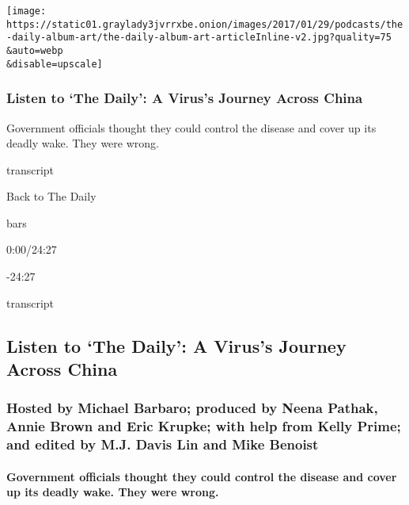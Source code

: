 \texttt{[image: https://static01.graylady3jvrrxbe.onion/images/2017/01/29/podcasts/the-daily-album-art/the-daily-album-art-articleInline-v2.jpg?quality=75\\\&auto=webp\\\&disable=upscale]}

\hypertarget{listen-to-the-daily-a-viruss-journey-across-china}{%
\subsubsection{Listen to `The Daily': A Virus's Journey Across
China}\label{listen-to-the-daily-a-viruss-journey-across-china}}

Government officials thought they could control the disease and cover up
its deadly wake. They were wrong.

transcript

Back to The Daily

bars

0:00/24:27

-24:27

transcript

\hypertarget{listen-to-the-daily-a-viruss-journey-across-china-1}{%
\subsection{Listen to `The Daily': A Virus's Journey Across
China}\label{listen-to-the-daily-a-viruss-journey-across-china-1}}

\hypertarget{hosted-by-michael-barbaro-produced-by-neena-pathak-annie-brown-and-eric-krupke-with-help-from-kelly-prime-and-edited-by-mj-davis-lin-and-mike-benoist}{%
\subsubsection{Hosted by Michael Barbaro; produced by Neena Pathak,
Annie Brown and Eric Krupke; with help from Kelly Prime; and edited by
M.J. Davis Lin and Mike
Benoist}\label{hosted-by-michael-barbaro-produced-by-neena-pathak-annie-brown-and-eric-krupke-with-help-from-kelly-prime-and-edited-by-mj-davis-lin-and-mike-benoist}}

\hypertarget{government-officials-thought-they-could-control-the-disease-and-cover-up-its-deadly-wake-they-were-wrong}{%
\paragraph{Government officials thought they could control the disease
and cover up its deadly wake. They were
wrong.}\label{government-officials-thought-they-could-control-the-disease-and-cover-up-its-deadly-wake-they-were-wrong}}

